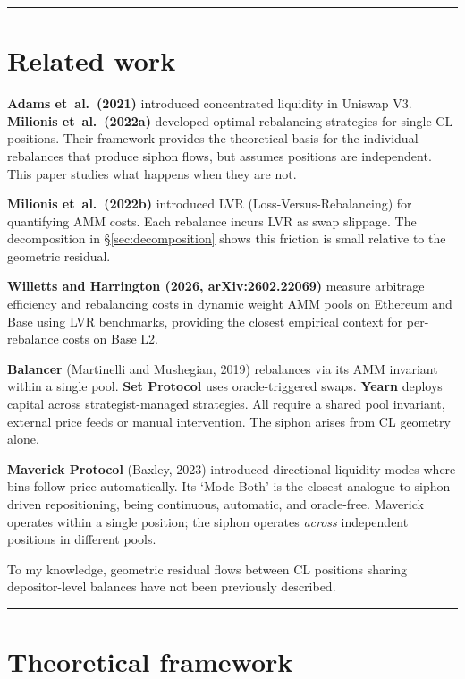 \documentclass[11pt,a4paper]{article}
\begin{document}
\begin{center}\rule{0.5\linewidth}{0.5pt}\end{center}

\section{Related work}\label{sec:related}

\textbf{Adams et~al.~(2021)} introduced concentrated liquidity in Uniswap V3. \textbf{Milionis et~al.~(2022a)} developed optimal rebalancing strategies for single CL positions. Their framework provides the theoretical basis for the individual rebalances that produce siphon flows, but assumes positions are independent. This paper studies what happens when they are not.

\textbf{Milionis et~al.~(2022b)} introduced LVR (Loss-Versus-Rebalancing) for quantifying AMM costs. Each rebalance incurs LVR as swap slippage. The decomposition in \S\ref{sec:decomposition} shows this friction is small relative to the geometric residual.

\textbf{Willetts and Harrington (2026, arXiv:2602.22069)} measure arbitrage efficiency and rebalancing costs in dynamic weight AMM pools on Ethereum and Base using LVR benchmarks, providing the closest empirical context for per-rebalance costs on Base L2.

\textbf{Balancer} (Martinelli and Mushegian, 2019) rebalances via its AMM invariant within a single pool. \textbf{Set Protocol} uses oracle-triggered swaps. \textbf{Yearn} deploys capital across strategist-managed strategies. All require a shared pool invariant, external price feeds or manual intervention. The siphon arises from CL geometry alone.

\textbf{Maverick Protocol} (Baxley, 2023) introduced directional liquidity modes where bins follow price automatically. Its `Mode Both' is the closest analogue to siphon-driven repositioning, being continuous, automatic, and oracle-free. Maverick operates within a single position; the siphon operates \emph{across} independent positions in different pools.

To my knowledge, geometric residual flows between CL positions sharing depositor-level balances have not been previously described.

\begin{center}\rule{0.5\linewidth}{0.5pt}\end{center}

\section{Theoretical framework}\label{sec:theory}
\end{document}
